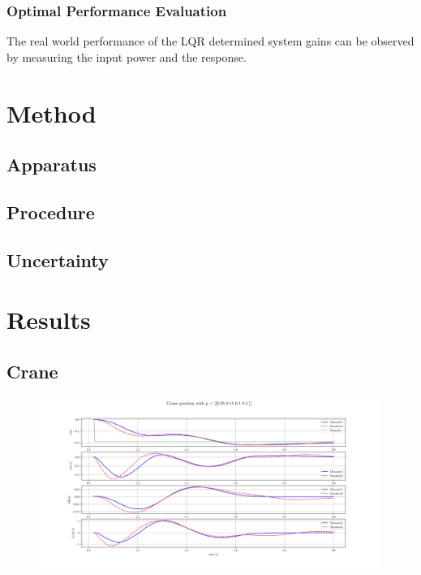 \documentclass{article}
\begin{document}
\subsubsection{Optimal Performance Evaluation}

The real world performance of the LQR determined system gains can be observed by measuring the input power and the response.

\section{Method}

\subsection{Apparatus}


\subsection{Procedure}


\subsection{Uncertainty}


\section{Results}

\subsection{Crane}

\begin{figure}[H]
  \centering
  \includegraphics[width=0.99\textwidth]{figures/3.3.png}
  \caption{}
  \label{fig:exp3.3}
\end{figure}
\end{document}
